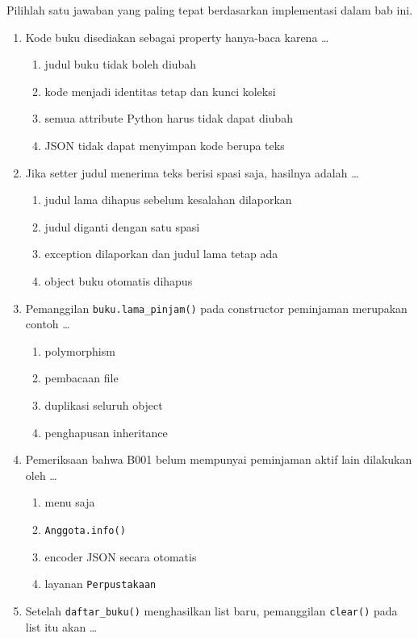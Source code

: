 Pilihlah satu jawaban yang paling tepat berdasarkan implementasi dalam bab ini.

\begin{enumerate}
  \item Kode buku disediakan sebagai property hanya-baca karena \ldots
  \begin{enumerate}[label=\alph*.,itemsep=0pt]
    \item judul buku tidak boleh diubah
    \item kode menjadi identitas tetap dan kunci koleksi
    \item semua attribute Python harus tidak dapat diubah
    \item JSON tidak dapat menyimpan kode berupa teks
  \end{enumerate}
  \item Jika setter judul menerima teks berisi spasi saja, hasilnya adalah \ldots
  \begin{enumerate}[label=\alph*.,itemsep=0pt]
    \item judul lama dihapus sebelum kesalahan dilaporkan
    \item judul diganti dengan satu spasi
    \item exception dilaporkan dan judul lama tetap ada
    \item object buku otomatis dihapus
  \end{enumerate}
  \item Pemanggilan \texttt{buku.lama\_pinjam()} pada constructor peminjaman merupakan contoh \ldots
  \begin{enumerate}[label=\alph*.,itemsep=0pt]
    \item polymorphism
    \item pembacaan file
    \item duplikasi seluruh object
    \item penghapusan inheritance
  \end{enumerate}
  \item Pemeriksaan bahwa B001 belum mempunyai peminjaman aktif lain dilakukan oleh \ldots
  \begin{enumerate}[label=\alph*.,itemsep=0pt]
    \item menu saja
    \item \texttt{Anggota.info()}
    \item encoder JSON secara otomatis
    \item layanan \texttt{Perpustakaan}
  \end{enumerate}
  \item Setelah \texttt{daftar\_buku()} menghasilkan list baru, pemanggilan \texttt{clear()} pada list itu akan \ldots

\end{enumerate}
